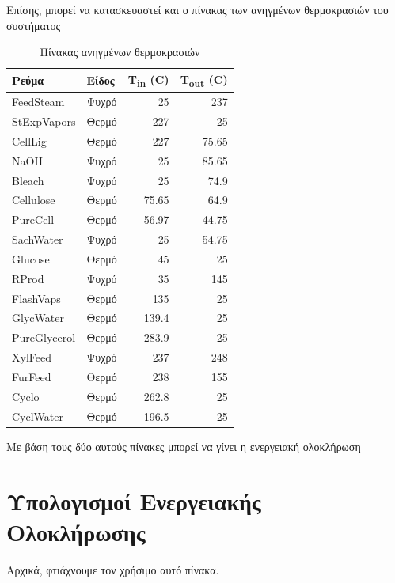 \documentclass[11pt]{article}
\begin{document}
Επίσης, μπορεί να κατασκευαστεί και ο πίνακας των ανηγμένων θερμοκρασιών του συστήματος
\begin{table}[htbp]
\caption{Πίνακας ανηγμένων θερμοκρασιών}
\centering
\begin{tabular}{llrr}
Ρεύμα & Είδος & Τ\textsubscript{in} (C) & T\textsubscript{out} (C)\\
\hline
FeedSteam & Ψυχρό & 25 & 237\\
StExpVapors & Θερμό & 227 & 25\\
CellLig & Θερμό & 227 & 75.65\\
NaOH & Ψυχρό & 25 & 85.65\\
Bleach & Ψυχρό & 25 & 74.9\\
Cellulose & Θερμό & 75.65 & 64.9\\
PureCell & Θερμό & 56.97 & 44.75\\
SachWater & Ψυχρό & 25 & 54.75\\
Glucose & Θερμό & 45 & 25\\
RProd & Ψυχρό & 35 & 145\\
FlashVaps & Θερμό & 135 & 25\\
GlycWater & Θερμό & 139.4 & 25\\
PureGlycerol & Θερμό & 283.9 & 25\\
XylFeed & Ψυχρό & 237 & 248\\
FurFeed & Θερμό & 238 & 155\\
Cyclo & Θερμό & 262.8 & 25\\
CyclWater & Θερμό & 196.5 & 25\\
\end{tabular}
\end{table}

Με βάση τους δύο αυτούς πίνακες μπορεί να γίνει η ενεργειακή ολοκλήρωση

\section{Υπολογισμοί Ενεργειακής Ολοκλήρωσης}
\label{sec:org10a0885}
Αρχικά, φτιάχνουμε τον χρήσιμο αυτό πίνακα.
\end{document}
